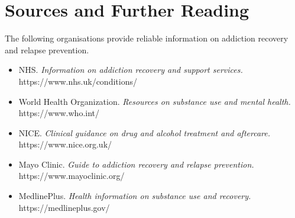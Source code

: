 \section*{Sources and Further Reading}
The following organisations provide reliable information on addiction recovery and relapse prevention.

\begin{itemize}
    \item NHS. \textit{Information on addiction recovery and support services.} https://www.nhs.uk/conditions/
    \item World Health Organization. \textit{Resources on substance use and mental health.} https://www.who.int/
    \item NICE. \textit{Clinical guidance on drug and alcohol treatment and aftercare.} https://www.nice.org.uk/
    \item Mayo Clinic. \textit{Guide to addiction recovery and relapse prevention.} https://www.mayoclinic.org/
    \item MedlinePlus. \textit{Health information on substance use and recovery.} https://medlineplus.gov/
\end{itemize}
